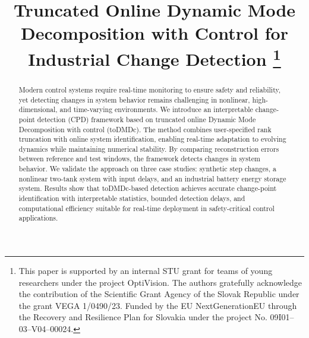 \documentclass[conference]{IEEEtran}
\begin{document}
\title{\vspace*{18pt}Truncated Online Dynamic Mode Decomposition with Control for Industrial Change Detection%
    \thanks{This paper is supported by an internal STU grant for teams of young researchers under the project OptiVision. The authors gratefully acknowledge the contribution of the Scientific Grant Agency of the Slovak Republic under the grant VEGA 1/0490/23. Funded by the EU NextGenerationEU through the Recovery and Resilience Plan for Slovakia under the project No. 09I01--03--V04--00024.}
}

\author{
    }

\maketitle

\begin{abstract}
    Modern control systems require real-time monitoring to ensure safety and reliability, yet detecting changes in system behavior remains challenging in nonlinear, high-dimensional, and time-varying environments. We introduce an interpretable change-point detection (CPD) framework based on truncated online Dynamic Mode Decomposition with control (toDMDc). The method combines user-specified rank truncation with online system identification, enabling real-time adaptation to evolving dynamics while maintaining numerical stability. By comparing reconstruction errors between reference and test windows, the framework detects changes in system behavior. We validate the approach on three case studies: synthetic step changes, a nonlinear two-tank system with input delays, and an industrial battery energy storage system. Results show that toDMDc-based detection achieves accurate change-point identification with interpretable statistics, bounded detection delays, and computational efficiency suitable for real-time deployment in safety-critical control applications.
\end{abstract}
\end{document}
